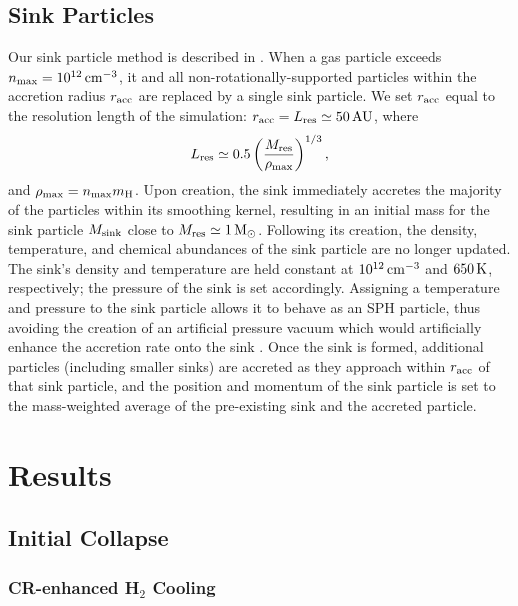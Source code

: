 \documentclass[usenatbib]{mn2e}
\newcommand{\kelvin}{\,{\rm K}}
\newcommand{\cc}{\,{\rm cm}^{-3}}
\newcommand{\msun}{\,{\rm M}_{\odot}}
\newcommand{\au}{\,{\rm AU}}
\begin{document}
\subsection{Sink Particles}
\label{sinkParticles}
Our sink particle method is described in \citet{StacyGreifBromm2010}. 
When a gas particle exceeds $n_{\rm max} = 10^{12}\cc$, it and all non-rotationally-supported particles within the accretion radius $r_{\rm acc}$ are replaced by a single sink particle.  
We set $r_{\rm acc}$ equal to the resolution length of the simulation: $r_{\rm acc} = L_{\rm res} \simeq 50\au$, where 
\begin{equation}
L_{\rm res} \simeq 0.5 \left( \frac{M_{\rm res}}{\rho_{\rm max}} \right)^{1/3},
\end{equation}
and $\rho_{\rm max} = n_{\rm max} m_{\rm H}$.  
Upon creation, the sink immediately accretes the majority of the particles within its smoothing kernel, resulting in an initial mass for the sink particle $M_{\rm sink}$ close to $M_{\rm res} \simeq 1\msun$.  
Following its creation, the density, temperature, and chemical abundances of the sink particle are no longer updated.  
The sink's density and temperature are held constant at $10^{12}\cc$ and $650\kelvin$, respectively; the pressure of the sink is set accordingly. 
Assigning a temperature and pressure to the sink particle allows it to behave as an SPH particle, thus avoiding the creation of an artificial pressure vacuum which would artificially enhance the accretion rate onto the sink \citep[see][]{BrommCoppiLarson2002, MartelEvansShapiro2006}. 
Once the sink is formed, additional particles (including smaller sinks) are accreted as they approach within $r_{\rm acc}$ of that sink particle, and the position and momentum of the sink particle is set to the mass-weighted average of the pre-existing sink and the accreted particle.

\section{Results}
\label{sec:results}
\subsection{Initial Collapse}
\subsubsection{CR-enhanced H$_2$ Cooling}
\label{sec:initial_collapse}
\end{document}
